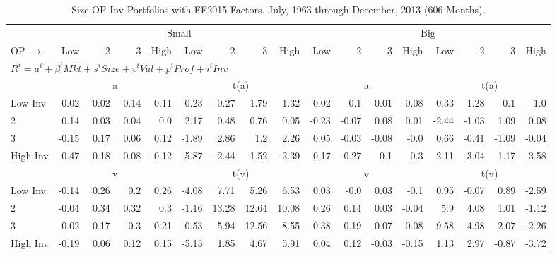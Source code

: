 
\begin{table}[!ht]
\centering
\caption{Size-OP-Inv Portfolios with FF2015 Factors. \footnotesize{July, 1963 through December, 2013 (606 Months).}}
\begin{tabular}{lrrrrrrrrrrrrrrrr}
  \toprule
    & \multicolumn{8}{c}{Small} & \multicolumn{8}{c}{Big} \\
      \cmidrule(r){2-9} \cmidrule(r){10-17}
    OP $\rightarrow$ & Low & 2 & 3 & High & Low & 2 & 3 & High & Low & 2 & 3 & High & Low & 2 & 3 & High \\ 
  \midrule
  \multicolumn{9}{l}{$R^i=a^i+\beta^iMkt+s^iSize+v^iVal+p^iProf+i^iInv$} \\

  
    
      & \multicolumn{4}{c}{a} & \multicolumn{4}{c}{t(a)}
    
      & \multicolumn{4}{c}{a} & \multicolumn{4}{c}{t(a)}
    
    \\
      \cmidrule(r){2-5} \cmidrule(r){6-9} \cmidrule(r){10-13} \cmidrule(r){14-17}

    Low Inv   & -0.02  & -0.02  & 0.14  & 0.11  & -0.23  & -0.27  & 1.79  & 1.32  & 0.02  & -0.1  & 0.01  & -0.08  & 0.33  & -1.28  & 0.1  & -1.0  \\
           2  & 0.14  & 0.03  & 0.04  & 0.0  & 2.17  & 0.48  & 0.76  & 0.05  & -0.23  & -0.07  & 0.08  & 0.01  & -2.44  & -1.03  & 1.09  & 0.08  \\
           3  & -0.15  & 0.17  & 0.06  & 0.12  & -1.89  & 2.86  & 1.2  & 2.26  & 0.05  & -0.03  & -0.08  & -0.0  & 0.66  & -0.41  & -1.09  & -0.04  \\
    High Inv  & -0.47  & -0.18  & -0.08  & -0.12  & -5.87  & -2.44  & -1.52  & -2.39  & 0.17  & -0.27  & 0.1  & 0.3  & 2.11  & -3.04  & 1.17  & 3.58  \\

  
    
      & \multicolumn{4}{c}{v} & \multicolumn{4}{c}{t(v)}
    
      & \multicolumn{4}{c}{v} & \multicolumn{4}{c}{t(v)}
    
    \\
      \cmidrule(r){2-5} \cmidrule(r){6-9} \cmidrule(r){10-13} \cmidrule(r){14-17}

    Low Inv   & -0.14  & 0.26  & 0.2  & 0.26  & -4.08  & 7.71  & 5.26  & 6.53  & 0.03  & -0.0  & 0.03  & -0.1  & 0.95  & -0.07  & 0.89  & -2.59  \\
           2  & -0.04  & 0.34  & 0.32  & 0.3  & -1.16  & 13.28  & 12.64  & 10.08  & 0.26  & 0.14  & 0.03  & -0.04  & 5.9  & 4.08  & 1.01  & -1.12  \\
           3  & -0.02  & 0.17  & 0.3  & 0.21  & -0.53  & 5.94  & 12.56  & 8.55  & 0.38  & 0.19  & 0.07  & -0.08  & 9.58  & 4.98  & 2.07  & -2.26  \\
    High Inv  & -0.19  & 0.06  & 0.12  & 0.15  & -5.15  & 1.85  & 4.67  & 5.91  & 0.04  & 0.12  & -0.03  & -0.15  & 1.13  & 2.97  & -0.87  & -3.72  \\


\end{tabular}
\end{table}
